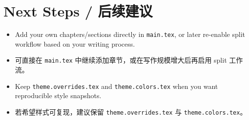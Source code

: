 \documentclass[oneside]{book}
\begin{document}

\chapter{Next Steps / 后续建议}

\begin{itemize}
    \item Add your own chapters/sections directly in \texttt{main.tex}, or later re-enable split workflow based on your writing process.
    \item 可直接在 \texttt{main.tex} 中继续添加章节，或在写作规模增大后再启用 split 工作流。
    \item Keep \texttt{theme.overrides.tex} and \texttt{theme.colors.tex} when you want reproducible style snapshots.
    \item 若希望样式可复现，建议保留 \texttt{theme.overrides.tex} 与 \texttt{theme.colors.tex}。
\end{itemize}
\end{document}
